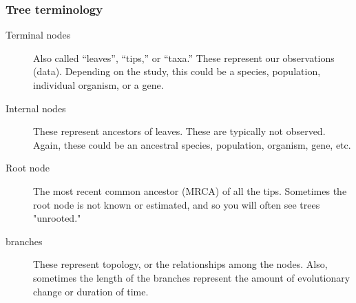 \begin{frame}
    \frametitle{Tree terminology}
    \begin{description}
        \item[Terminal nodes]
            Also called ``leaves'', ``tips,'' or ``taxa.''
            These represent our observations (data).
            Depending on the study, this could be a species, population,
            individual organism, or a gene.
        \item[Internal nodes]
            These represent ancestors of leaves.
            These are typically not observed.
            Again, these could be an ancestral species, population,
            organism, gene, etc.
        \item[Root node]
            The most recent common ancestor (MRCA) of all the tips.
            Sometimes the root node is not known or estimated, and so
            you will often see trees "unrooted."
        \item[branches]
            These represent topology, or the relationships among the nodes.
            Also, sometimes the length of the branches represent the amount
            of evolutionary change or duration of time.
    \end{description}
\end{frame}

